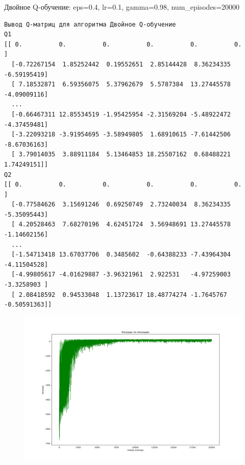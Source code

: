 \documentclass[a4paper]{article}
\begin{document}
  \noindent Двойное Q-обучение: eps=0.4, lr=0.1, gamma=0.98, num\_episodes=20000
  \begin{verbatim}
Вывод Q-матриц для алгоритма Двойное Q-обучение
Q1
[[ 0.          0.          0.          0.          0.          0.        ]
  [-0.72267154  1.85252442  0.19552651  2.85144428  8.36234335 -6.59195419]
  [ 7.18532871  6.59356075  5.37962679  5.5787384  13.27445578 -4.09009116]
  ...
  [-0.66467311 12.85534519 -1.95425954 -2.31569204 -5.48922472 -4.37459481]
  [-3.22093218 -3.91954695 -3.58949805  1.68910615 -7.61442506 -8.67036163]
  [ 3.79014035  3.88911184  5.13464853 18.25507162  0.68488221  1.74249151]]
Q2
[[ 0.          0.          0.          0.          0.          0.        ]
  [-0.77584626  3.15691246  0.69250749  2.73240034  8.36234335 -5.35095443]
  [ 4.20528463  7.68270196  4.62451724  3.56948691 13.27445578 -1.14602156]
  ...
  [-1.54713418 13.67037706  0.3485602  -0.64388233 -7.43964304 -4.11504528]
  [-4.99805617 -4.01629887 -3.96321961  2.922531   -4.97259003 -3.3258903 ]
  [ 2.08418592  0.94533048  1.13723617 18.48774274 -1.7645767  -0.50591363]]
  \end{verbatim}
  \begin{figure}[H]
    \includegraphics[scale=0.35]{53}
  \end{figure}
\end{document}
